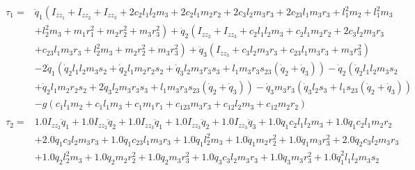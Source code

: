 \begin{align}
    \begin{split}
        \tau_1 =& \ddot{q}_1 \left(I_{zz_1} + I_{zz_2} + I_{zz_3} + 2 c_{2} l_{1} l_{2} m_{3} + 2 c_{2} l_{1} m_{2} r_{2} + 2 c_{3} l_{2} m_{3} r_{3} + 2 c_{23} l_{1} m_{3} r_{3} + l_{1}^{2} m_{2} + l_{1}^{2} m_{3} \right.\\
            & \left. + l_{2}^{2} m_{3} + m_{1} r_{1}^{2} + m_{2} r_{2}^{2} + m_{3} r_{3}^{2}\right) + \ddot{q}_2 \left(I_{zz_2} + I_{zz_3} + c_{2} l_{1} l_{2} m_{3} + c_{2} l_{1} m_{2} r_{2} + 2 c_{3} l_{2} m_{3} r_{3} \right. \\
            & \left. + c_{23} l_{1} m_{3} r_{3} + l_{2}^{2} m_{3} + m_{2} r_{2}^{2} + m_{3} r_{3}^{2}\right) + \ddot{q}_3 \left(I_{zz_3} + c_{3} l_{2} m_{3} r_{3} + c_{23} l_{1} m_{3} r_{3} + m_{3} r_{3}^{2}\right) \\
            & - 2 \dot{q}_1 \left(\dot{q}_2 l_{1} l_{2} m_{3} s_{2} + \dot{q}_2 l_{1} m_{2} r_{2} s_{2} + \dot{q}_3 l_{2} m_{3} r_{3} s_{3} + l_{1} m_{3} r_{3} s_{23} \left(\dot{q}_2 + \dot{q}_3\right)\right) - \dot{q}_2 \left(\dot{q}_2 l_{1} l_{2} m_{3} s_{2} \right. \\
            & \left. + \dot{q}_2 l_{1} m_{2} r_{2} s_{2} + 2 \dot{q}_3 l_{2} m_{3} r_{3} s_{3} + l_{1} m_{3} r_{3} s_{23} \left(\dot{q}_2 + \dot{q}_3\right)\right) - \dot{q}_3 m_{3} r_{3} \left(\dot{q}_3 l_{2} s_{3} + l_{1} s_{23} \left(\dot{q}_2 + \dot{q}_3\right)\right) \\
            & - g \left(c_{1} l_{1} m_{2} + c_{1} l_{1} m_{3} + c_{1} m_{1} r_{1} + c_{123} m_{3} r_{3} + c_{12} l_{2} m_{3} + c_{12} m_{2} r_{2}\right)
    \end{split}
    \label{eq:3r-dyn-tau-vect-elem1}
    \\
    \begin{split}
        \tau_2 =& 1.0 I_{zz_2} \ddot{q}_1 + 1.0 I_{zz_2} \ddot{q}_2 + 1.0 I_{zz_3} \ddot{q}_1 + 1.0 I_{zz_3} \ddot{q}_2 + 1.0 I_{zz_3} \ddot{q}_3 + 1.0 \ddot{q}_1 c_{2} l_{1} l_{2} m_{3} + 1.0 \ddot{q}_1 c_{2} l_{1} m_{2} r_{2} \\
            & + 2.0 \ddot{q}_1 c_{3} l_{2} m_{3} r_{3} + 1.0 \ddot{q}_1 c_{23} l_{1} m_{3} r_{3} + 1.0 \ddot{q}_1 l_{2}^{2} m_{3} + 1.0 \ddot{q}_1 m_{2} r_{2}^{2} + 1.0 \ddot{q}_1 m_{3} r_{3}^{2} + 2.0 \ddot{q}_2 c_{3} l_{2} m_{3} r_{3} \\
            & + 1.0 \ddot{q}_2 l_{2}^{2} m_{3} + 1.0 \ddot{q}_2 m_{2} r_{2}^{2} + 1.0 \ddot{q}_2 m_{3} r_{3}^{2} + 1.0 \ddot{q}_3 c_{3} l_{2} m_{3} r_{3} + 1.0 \ddot{q}_3 m_{3} r_{3}^{2} + 1.0 \dot{q}_1^{2} l_{1} l_{2} m_{3} s_{2} \\

\end{split}
\end{align}
